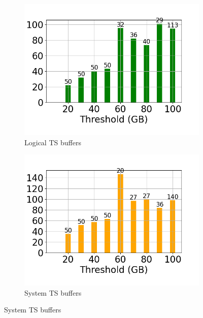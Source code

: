 \begin{figure}
	\centering
	\begin{subfigure}[c]{0.4\textwidth}
		\includegraphics[width=1\textwidth]   {figures/Experiments/Dynamic/Progress/3/average_query_time_per_batch_version_999777015_10485760_10_delay[3].png}
		\caption{Logical TS buffers}
		\label{fig:progress-queries-3-logical}
	\end{subfigure}
	\begin{subfigure}[c]{0.4\textwidth}
		\includegraphics[width=1\textwidth]   {figures/Experiments/Dynamic/Progress/3/average_query_time_per_batch_version_999777018_10485760_10_delay[3].png}
		\caption{System TS buffers}
		\label{fig:progress-queries-3-system}

\end{subfigure}
\end{figure}
